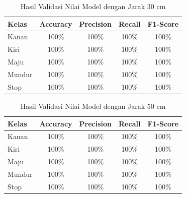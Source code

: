 \begin{table}[ht]
  \caption{Hasil Validasi Nilai Model dengan Jarak 30 cm}
  \label{tb:30cm}
  \centering
  \begin{tabular}{|l|c|c|c|c|}
  \hline
  \rowcolor[HTML]{C0C0C0} 
  \textbf{Kelas} & \textbf{Accuracy} & \textbf{Precision} & \textbf{Recall} & \textbf{F1-Score} \\ \hline
  Kanan    & 100\%            & 100\%             & 100\%           & 100\%            \\ \hline
  Kiri     & 100\%          & 100\%           & 100\%           & 100\%           \\ \hline
  Maju      & 100\%          & 100\%           & 100\%          & 100\%          \\ \hline
  Mundur     & 100\%            & 100\%             & 100\%           & 100\%            \\ \hline
  Stop  & 100\%            & 100\%             & 100\%           & 100\%            \\ \hline
  \end{tabular}
\end{table}

\begin{table}[ht]
  \caption{Hasil Validasi Nilai Model dengan Jarak 50 cm}
  \label{tb:50cm}
  \centering
  \begin{tabular}{|l|c|c|c|c|}
  \hline
  \rowcolor[HTML]{C0C0C0} 
  \textbf{Kelas} & \textbf{Accuracy} & \textbf{Precision} & \textbf{Recall} & \textbf{F1-Score} \\ \hline
  Kanan    & 100\%            & 100\%             & 100\%           & 100\%            \\ \hline
  Kiri     & 100\%          & 100\%           & 100\%           & 100\%           \\ \hline
  Maju      & 100\%          & 100\%           & 100\%          & 100\%          \\ \hline
  Mundur     & 100\%            & 100\%             & 100\%           & 100\%            \\ \hline
  Stop  & 100\%            & 100\%             & 100\%           & 100\%            \\ \hline
  \end{tabular}
\end{table}

